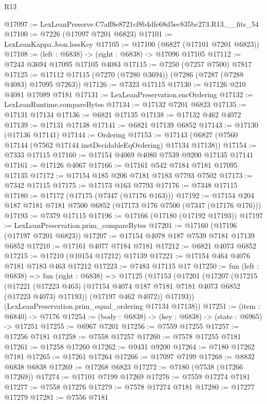 \begin{lexlean}{R13}
\begin{coremodule}
@17097 := LexLeanPreserve.C7aff8e8721cf8b4dfe68d5ec835bc273.R13.__fits_54
@17100 := @7226 (@17097 @7201 @6823)
@17101 := LexLeanKappa.Json.lessKey
@17105 := @17100 (@6827 (@17101 @7201 @6823))
@17108 := (left : @6838) -> (right : @6838) -> @17096 @17105
@17112 := @7243 @3694 @17095 @17105 @4083
@17115 := @7250 (@7257 @7500) @7817
@17125 := @17112 @17115 (@7270 (@7280 @3694)) (@7286 (@7287 (@7288 @4083) @17095 @7263))
@17126 := @7323 @17115
@17130 := @17126 @210 @4081 @17089 @7181
@17131 := LexLeanPreservation.encOrdering
@17132 := LexLeanRuntime.compareBytes
@17134 := @17132 @7201 @6823
@17135 := @17131 @17134
@17136 := @6821 @17135
@17138 := @17132 @462 @4072
@17139 := @17131 @17138
@17141 := @6821 @17139 @6852
@17143 := @17130 (@17136 @17141)
@17144 := Ordering
@17153 := @17143 (@6827 (@7560 @17144 (@7562 @17144 instDecidableEqOrdering) @17134 @17138))
@17154 := @7333 @17115
@17160 := @17154 @4069 @4080 @7539 @9200 @17135 @17141
@17161 := @17126 @4067
@17166 := @17161 @542 @7184 @7181 @17095 @17135
@17172 := @17154 @185 @206 @7181 @7183 @7793 @7502
@17173 := @7342 @17115
@17175 := @17173 @163 @7793
@17176 := @7348 @17115
@17180 := @17172 (@17175 (@7347 (@17176 @163)))
@17192 := @17154 @204 @187 @7181 @7181 @7500 @6852 (@17173 @176 @7500 (@7347 (@17176 @176)))
@17193 := @7379 @17115
@17196 := @17166 (@17180 (@17192 @17193))
@17197 := LexLeanPreservation.prim_compareBytes
@17201 := @17160 (@17196 (@17197 @7201 @6823))
@17207 := @17154 @4078 @187 @7539 @7181 @17139 @6852
@17210 := @17161 @4077 @7184 @7181
@17212 := @6821 @4073 @6852
@17215 := @17210 (@10154 @17212) @17139
@17221 := @17154 @464 @4076 @7181 @7183 @463 @17212
@17223 := @7483 @17115 @17
@17250 := fun (left : @6838) =>
  fun (right : @6838) =>
  @17125
    (@17153
      (@17201
        (@17207
          (@17215
            (@17221 (@17223 @463) (@17154 @4074 @187 @7181 @7181 @4073 @6852 (@17223 @4073) @17193))
            (@17197 @462 @4072))
          @17193))
      (LexLeanPreservation.prim_equal_ordering @17134 @17138))
@17251 := (item : @6840) -> @7176
@17254 := (body : @6838) -> (key : @6838) -> (state : @6965) -> @17251
@17255 := @6967 @7201
@17256 := @7559 @17255
@17257 := @17256 @7181
@17258 := @7558 @17257
@17260 := @7578 @17255 @7181
@17261 := @17258 @17260
@17262 := @9431 @9200
@17264 := @7180 @17262 @7181
@17265 := @17261 @17264
@17266 := @17097 @7199
@17268 := @8832 @6838 @6838
@17269 := @17268 @6823
@17272 := @7180 (@7538 (@17266 @17269))
@17274 := @17101 @7199 @17269
@17276 := @7559 @17274 @7181
@17277 := @7558 @17276
@17279 := @7578 @17274 @7181
@17280 := @17277 @17279
@17281 := @7556 @7181

\end{coremodule}
\end{lexlean}
